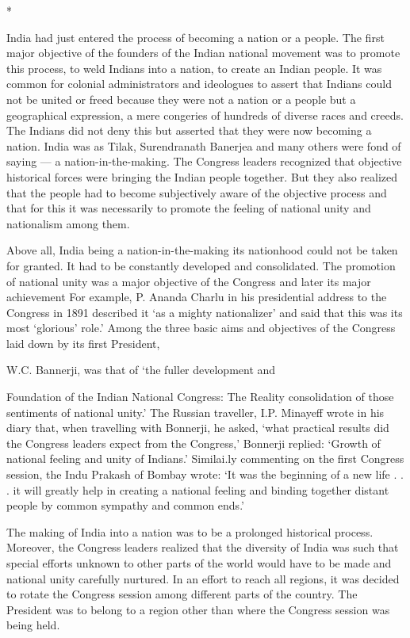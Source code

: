 \begin{center}*\end{center}



India had just entered the process of becoming a nation or a people. The first major objective of the founders of the Indian national movement was to promote this process, to weld Indians into a nation, to create an Indian people. It was common for colonial administrators and ideologues to assert that Indians could not be united or freed because they were not a nation or a people but a geographical expression, a mere congeries of hundreds of diverse races and creeds. The Indians did not deny this but asserted that they were now becoming a nation. India was as Tilak, Surendranath Banerjea and many others were fond of saying — a nation-in-the-making. The Congress leaders recognized that objective historical forces were bringing the Indian people together. But they also realized that the people had to become subjectively aware of the objective process and that for this it was necessarily to promote the feeling of national unity and nationalism among them.

Above all, India being a nation-in-the-making its nationhood could not be taken for granted. It had to be constantly developed and consolidated. The promotion of national unity was a major objective of the Congress and later its major achievement For example, P. Ananda Charlu in his presidential address to the Congress in 1891 described it ‘as a mighty nationalizer’ and said that this was its most ‘glorious’ role.’ Among the three basic aims and objectives of the Congress laid down by its first President,

W.C. Bannerji, was that of ‘the fuller development and

Foundation of the Indian National Congress: The Reality consolidation of those sentiments of national unity.’ The Russian traveller, I.P. Minayeff wrote in his diary that, when travelling with Bonnerji, he asked, ‘what practical results did the Congress leaders expect from the Congress,’ Bonnerji replied: ‘Growth of national feeling and unity of Indians.’ Similai.ly commenting on the first Congress session, the Indu Prakash of Bombay wrote: ‘It was the beginning of a new life . . . it will greatly help in creating a national feeling and binding together distant people by common sympathy and common ends.’

The making of India into a nation was to be a prolonged historical process. Moreover, the Congress leaders realized that the diversity of India was such that special efforts unknown to other parts of the world would have to be made and national unity carefully nurtured. In an effort to reach all regions, it was decided to rotate the Congress session among different parts of the country. The President was to belong to a region other than where the Congress session was being held.

